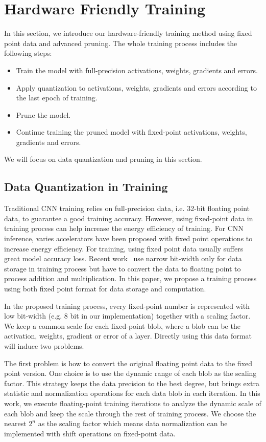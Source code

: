 \section{Hardware Friendly Training}\label{sec:training}
In this section, we introduce our hardware-friendly training method using fixed point data and advanced pruning. The whole training process includes the following steps:
\begin{itemize}
  \item Train the model with full-precision activations, weights, gradients and errors.
  \item Apply quantization to activations, weights, gradients and errors according to the last epoch of training.
  \item Prune the model. 
  \item Continue training the pruned model with fixed-point activations, weights, gradients and errors.
\end{itemize}
We will focus on data quantization and pruning in this section.

\subsection{Data Quantization in Training}
Traditional CNN training relies on full-precision data, i.e. 32-bit floating point data, to guarantee a good training accuracy. However, using fixed-point data in training process can help increase the energy efficiency of training. For CNN inference, varies accelerators have been proposed with fixed point operations to increase energy efficiency. For training, using fixed point data usually suffers great model accuracy loss. Recent work~\cite{zhou2016dorefa} use narrow bit-width only for data storage in training process but have to convert the data to floating point to process addition and multiplication. In this paper, we propose a training process using both fixed point format for data storage and computation. 

In the proposed training process, every fixed-point number is represented with low bit-width (e.g. 8 bit in our implementation) together with a scaling factor. We keep a common scale for each fixed-point blob, where a blob can be the activation, weights, gradient or error of a layer. Directly using this data format will induce two problems.

The first problem is how to convert the original floating point data to the fixed point version. One choice is to use the dynamic range of each blob as the scaling factor. This strategy keeps the data precision to the best degree, but brings extra statistic and normalization operations for each data blob in each iteration. In this work, we execute floating-point training iterations to analyze the dynamic scale of each blob and keep the scale through the rest of training process. We choose the nearest $2^n$ as the scaling factor which means data normalization can be implemented with shift operations on fixed-point data.

